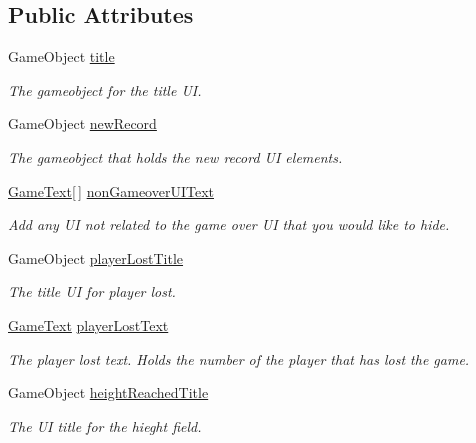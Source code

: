 \subsection*{Public Attributes}
\begin{DoxyCompactItemize}
\item 
Game\+Object \hyperlink{class_multi_stack_1_1_game_over_u_i_a05e9dc451638ae9d0a414eb45145f9cc}{title}
\begin{DoxyCompactList}\small\item\em The gameobject for the title U\+I. \end{DoxyCompactList}\item 
Game\+Object \hyperlink{class_multi_stack_1_1_game_over_u_i_ae3084bf607085cbb2cc4d8c4e7897c4b}{new\+Record}
\begin{DoxyCompactList}\small\item\em The gameobject that holds the new record U\+I elements. \end{DoxyCompactList}\item 
\hyperlink{class_multi_stack_1_1_game_text}{Game\+Text}\mbox{[}$\,$\mbox{]} \hyperlink{class_multi_stack_1_1_game_over_u_i_ac8abcfde257e94e4d943e193adff17b9}{non\+Gameover\+U\+I\+Text}
\begin{DoxyCompactList}\small\item\em Add any U\+I not related to the game over U\+I that you would like to hide. \end{DoxyCompactList}\item 
Game\+Object \hyperlink{class_multi_stack_1_1_game_over_u_i_adb0fbbb861cbd3ffe4afee821e549892}{player\+Lost\+Title}
\begin{DoxyCompactList}\small\item\em The title U\+I for player lost. \end{DoxyCompactList}\item 
\hyperlink{class_multi_stack_1_1_game_text}{Game\+Text} \hyperlink{class_multi_stack_1_1_game_over_u_i_a8b3c9a1f48b013cbfb3cc2581e98ba0f}{player\+Lost\+Text}
\begin{DoxyCompactList}\small\item\em The player lost text. Holds the number of the player that has lost the game. \end{DoxyCompactList}\item 
Game\+Object \hyperlink{class_multi_stack_1_1_game_over_u_i_a1d0719d80ce2ba07002511401b65d77c}{height\+Reached\+Title}
\begin{DoxyCompactList}\small\item\em The U\+I title for the hieght field. \end{DoxyCompactList}\item 

\end{DoxyCompactItemize}
